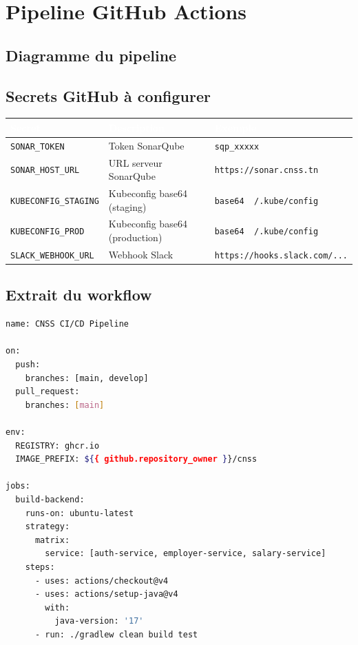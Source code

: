 \documentclass[12pt,a4paper]{article}
\begin{document}
\newpage

\section{Pipeline GitHub Actions}

\subsection{Diagramme du pipeline}

\begin{center}
    \fbox{}
\end{center}

\subsection{Secrets GitHub à configurer}

\begin{center}
\begin{tabular}{|l|l|l|}
\hline
\rowcolor{primary}
\textcolor{white}{\textbf{Secret}} & \textcolor{white}{\textbf{Description}} & \textcolor{white}{\textbf{Exemple}} \\
\hline
\texttt{SONAR\_TOKEN} & Token SonarQube & \texttt{sqp\_xxxxx} \\
\texttt{SONAR\_HOST\_URL} & URL serveur SonarQube & \texttt{https://sonar.cnss.tn} \\
\texttt{KUBECONFIG\_STAGING} & Kubeconfig base64 (staging) & \texttt{base64 ~/.kube/config} \\
\texttt{KUBECONFIG\_PROD} & Kubeconfig base64 (production) & \texttt{base64 ~/.kube/config} \\
\texttt{SLACK\_WEBHOOK\_URL} & Webhook Slack & \texttt{https://hooks.slack.com/...} \\
\hline
\end{tabular}
\end{center}

\subsection{Extrait du workflow}

\begin{lstlisting}[language=bash,caption={.github/workflows/ci-cd.yml}]
name: CNSS CI/CD Pipeline

on:
  push:
    branches: [main, develop]
  pull_request:
    branches: [main]

env:
  REGISTRY: ghcr.io
  IMAGE_PREFIX: ${{ github.repository_owner }}/cnss

jobs:
  build-backend:
    runs-on: ubuntu-latest
    strategy:
      matrix:
        service: [auth-service, employer-service, salary-service]
    steps:
      - uses: actions/checkout@v4
      - uses: actions/setup-java@v4
        with:
          java-version: '17'
      - run: ./gradlew clean build test
\end{lstlisting}
\end{document}
